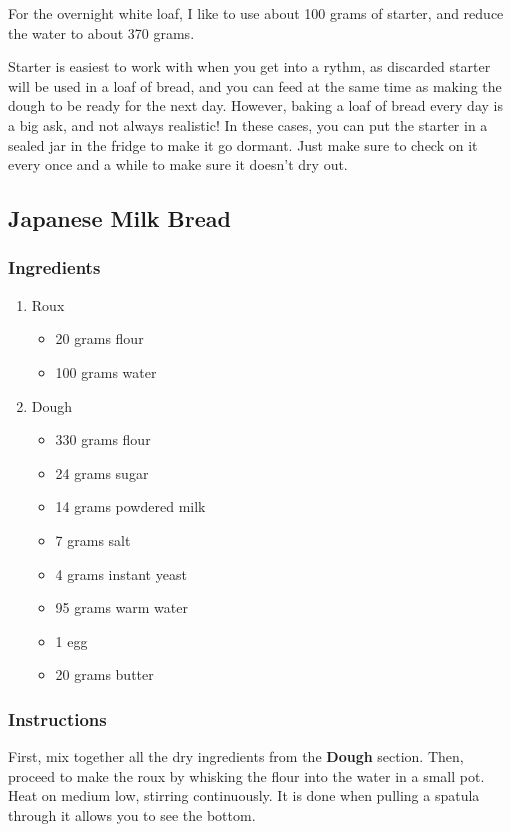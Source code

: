 \documentclass[11pt]{article}
\begin{document}
For the overnight white loaf, I like to use about 100 grams of
starter, and reduce the water to about 370 grams.

Starter is easiest to work with when you get into a rythm, as
discarded starter will be used in a loaf of bread, and you can feed
at the same time as making the dough to be ready for the next day.
However, baking a loaf of bread every day is a big ask, and not
always realistic! In these cases, you can put the starter in a
sealed jar in the fridge to make it go dormant. Just make sure to
check on it every once and a while to make sure it doesn't dry out.

\subsection{Japanese Milk Bread}
\label{sec:org2efd08a}
\subsubsection{Ingredients}
\label{sec:org83cc391}
\begin{enumerate}
\item Roux
\label{sec:org14502da}
\begin{itemize}
\item 20 grams flour
\item 100 grams water
\end{itemize}
\item Dough
\label{sec:org3d9225a}
\begin{itemize}
\item 330 grams flour
\item 24 grams sugar
\item 14 grams powdered milk
\item 7 grams salt
\item 4 grams instant yeast
\item 95 grams warm water
\item 1 egg
\item 20 grams butter
\end{itemize}
\end{enumerate}
\subsubsection{Instructions}
\label{sec:org72b8a59}
First, mix together all the dry ingredients from the \textbf{Dough}
section. Then, proceed to make the roux by whisking the flour into
the water in a small pot. Heat on medium low, stirring
continuously. It is done when pulling a spatula through it allows
you to see the bottom.
\end{document}
